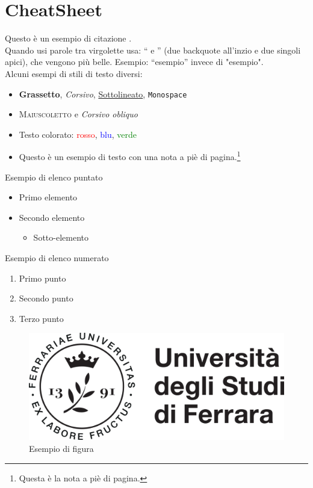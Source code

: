 \chapter{CheatSheet}
Questo è un esempio di citazione \cite{attention}. \\[8pt]
Quando usi parole tra virgolette usa:  ``  e '' (due backquote all'inzio e due singoli apici), che vengono più belle. Esempio: ``esempio'' invece di "esempio". \\[8pt]
Alcuni esempi di stili di testo diversi:
\begin{itemize}
    \item \textbf{Grassetto}, \textit{Corsivo}, \underline{Sottolineato}, \texttt{Monospace}
    \item \textsc{Maiuscoletto} e \textsl{Corsivo obliquo}
    \item Testo colorato: \textcolor{red}{rosso}, \textcolor{blue}{blu}, \textcolor{green}{verde}
    \item Questo è un esempio di testo con una nota a piè di pagina.\footnote{Questa è la nota a piè di pagina.}
\end{itemize}




Esempio di elenco puntato
\begin{itemize}
    \item Primo elemento
    \item Secondo elemento
    \begin{itemize}
        \item Sotto-elemento
    \end{itemize}
\end{itemize}


Esempio di elenco numerato
\begin{enumerate}
    \item Primo punto
    \item Secondo punto
    \item Terzo punto
\end{enumerate}



\begin{figure}[t]
\begin{center}
\includegraphics[scale=0.5]{immagini/logo.png}
\end{center}
\caption{ Esempio di figura}\label{fig:uni}
\end{figure}

